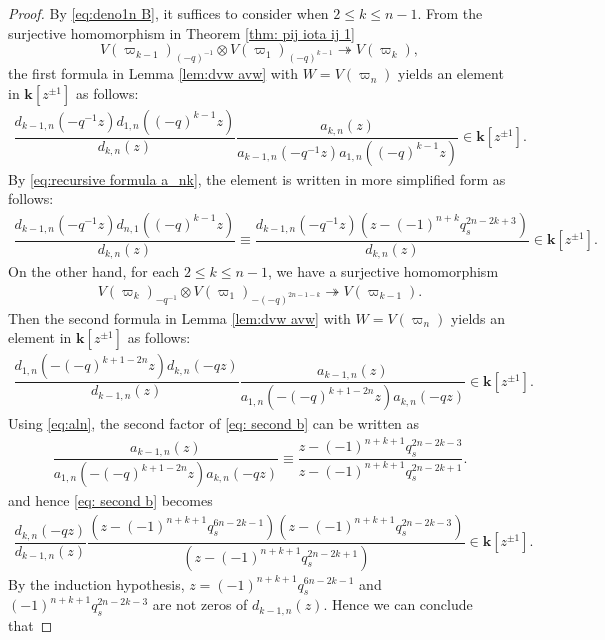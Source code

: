 \documentclass[11pt, leqno]{amsart}
\theoremstyle{definition}
\numberwithin{equation}{section}
\begin{document}
\begin{proof}
By \eqref{eq:deno1n B}, it suffices to consider when $2 \le k \le n-1$.
From the surjective homomorphism in Theorem \ref{thm: pij iota ij 1}
$$V(\varpi_{k-1})_{(-q)^{-1}} \otimes  V({\varpi}_1)_{(-q)^{k-1}}\twoheadrightarrow V({\varpi}_k),$$
the first formula in Lemma \ref{lem:dvw avw} with $W=V({\varpi}_n)$ yields an element in ${\mathbf{k}}[z^{\pm 1}]$ as follows:
\begin{align*}
    \dfrac{d_{k-1,n}(-q^{-1}z) d_{1,n}((-q)^{k-1}z)}{d_{k,n}(z)} \dfrac{a_{k,n}(z)}
  { a_{k-1,n}(-q^{-1}z) a_{1,n}((-q)^{k-1}z)} \in {\mathbf{k}}[z^{\pm 1}].
  \end{align*}
By \eqref{eq:recursive formula a_nk}, the element is written in more simplified form as follows:
\begin{align} \label{eq:dkn form 1}
    \dfrac{d_{k-1,n}(-q^{-1}z) d_{n,1}((-q)^{k-1}z) }
  {d_{k,n}(z)}
 \equiv\dfrac{d_{k-1,n}(-q^{-1}z) (z-(-1)^{n+k}q_s^{2n-2k+3}) }
  {d_{k,n}(z)}
    \in {\mathbf{k}}[z^{\pm 1}].
  \end{align}
On the other hand, for each $2 \le k \le n-1 $, we have a surjective
homomorphism
\begin{align*}
V(\varpi_k)_{-q^{-1}} \otimes V(\varpi_1)_{-(-q)^{2n-1-k}} \twoheadrightarrow
V(\varpi_{k-1}).
  \end{align*}
Then the second formula in Lemma \ref{lem:dvw avw} with $W=V({\varpi}_n)$ yields an element in ${\mathbf{k}}[z^{\pm 1}]$ as follows:
\begin{align} \label{eq: second b}
    \dfrac{d_{1,n}(-(-q)^{k+1-2n}z) d_{k,n}(-qz)}{d_{k-1,n}(z)}\dfrac{ a_{k-1,n}(z)}
  { a_{1,n}(-(-q)^{k+1-2n}z) a_{k,n}(-qz)} \in {\mathbf{k}}[z^{\pm 1}].
  \end{align}
Using \eqref{eq:aln}, the second factor of \eqref{eq: second b} can be written as
\begin{align*}
    \dfrac{ a_{k-1,n}(z)}
  {a_{1,n}(-(-q)^{k+1-2n}z) a_{k,n}(-qz) }
  \equiv
  \dfrac{z-(-1)^{n+k+1}q_s^{2n-2k-3}}{z-(-1)^{n+k+1}q_s^{2n-2k+1}}.
\end{align*}
and hence \eqref{eq: second b} becomes
    \begin{align*}
    \dfrac{ d_{k,n}(-qz) }
  {d_{k-1,n}(z)}
  \dfrac{(z-(-1)^{n+k+1}q_s^{6n-2k-1})(z-(-1)^{n+k+1}q_s^{2n-2k-3})}{(z-(-1)^{n+k+1}q_s^{2n-2k+1})} \in {\mathbf{k}}[z^{\pm 1}].
  \end{align*}
By the induction hypothesis, $z=(-1)^{n+k+1}q_s^{6n-2k-1}$ and $(-1)^{n+k+1}q_s^{2n-2k-3}$ are not zeros of $d_{k-1,n}(z)$.
Hence we can conclude that

\end{proof}
\end{document}
